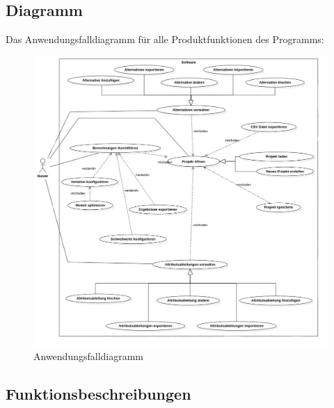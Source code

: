 \documentclass{article}
\begin{document}
\subsection{Diagramm}
Das Anwendungsfalldiagramm für alle Produktfunktionen des Programms:
\begin{figure}[H]%
  \centering
  \includegraphics[width=15cm]{specifications/img/use-case/UseCaseDiagramFinal2NWM.jpg}
  \caption{Anwendungsfalldiagramm}
\end{figure} 
\newpage
{}

\subsection{Funktionsbeschreibungen}
\end{document}
